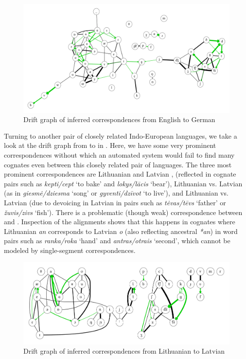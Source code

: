 \begin{figure}
    \includegraphics[width=\textwidth]{figures/drift-graph-en-de.pdf}
    \caption{Drift graph of inferred correspondences from English to German}
    \label{fig:driftGraphEnDe}
\end{figure}

Turning to another pair of closely related Indo-European languages, we take a look at the drift graph from  to  in . Here, we have some very prominent correspondences without which an automated system would fail to find many cognates even between this closely related pair of languages. The three most prominent correspondences are Lithuanian \ipa{[k]} and Latvian \ipa{[\t{ts}]}, (reflected in cognate pairs such as \textit{kepti/cept} `to bake' and \textit{lokys/l\={a}cis} `bear'), Lithuanian \ipa{[g]} vs. Latvian \ipa{[\t{dz}]} (as in \textit{giesm\.{e}/dziesma} `song' or \textit{gyventi/dz\=ivot} `to live'), and Lithuanian \ipa{[V]} vs. Latvian \ipa{[f]} (due to devoicing in Latvian in pairs such as \textit{t\.{e}vas/t\={e}vs} `father' or \textit{\v{z}uvis/zivs} `fish'). There is a problematic (though weak) correspondence between \ipa{[n]} and \ipa{[O]}. Inspection of the alignments shows that this happens in cognates where Lithuanian \textit{an} \ipa{[5n]} corresponds to Latvian \textit{o} \ipa{[uO]} (also reflecting ancestral \textit{*an}) in word pairs such as \textit{ranka/roka} `hand' and \textit{antras/otrais} `second', which cannot be modeled by single-segment correspondences.

\begin{figure}
    \includegraphics[width=\textwidth]{figures/drift-graph-lt-lv.pdf}
    \caption{Drift graph of inferred correspondences from Lithuanian to Latvian}
    \label{fig:driftGraphLtLv}
\end{figure}

